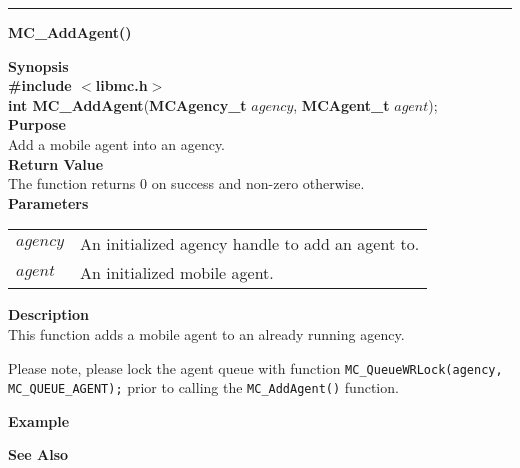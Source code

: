 \noindent
\vspace{5pt}
\rule{6.5in}{0.015in}
\noindent
{}
{\LARGE \bf MC\_AddAgent()}\\
\label{api:MC_AddAgent()}

\noindent
{\bf Synopsis}\\
{\bf \#include $<$libmc.h$>$}\\
{\bf int MC\_AddAgent}({\bf MCAgency\_t} $agency$, {\bf MCAgent\_t} $agent$);\\

\noindent
{\bf Purpose}\\
Add a mobile agent into an agency.\\

\noindent
{\bf Return Value}\\
The function returns 0 on success and non-zero otherwise.\\

\noindent
{\bf Parameters}
\vspace{-0.1in}
\begin{description}
\item
\begin{tabular}{p{10 mm}p{145 mm}} 
$agency$ & An initialized agency handle to add an agent to.\\
$agent$ & An initialized mobile agent.
\end{tabular}
\end{description}

\noindent
{\bf Description}\\
This function adds a mobile agent to an already running agency.

Please note, please lock the agent queue with function
\texttt{MC\_QueueWRLock(agency, MC\_QUEUE\_AGENT);} prior
to calling the \texttt{MC\_AddAgent()} function.

\noindent
{\bf Example}\\
\noindent
{\footnotesize}

\noindent
{\bf See Also}\\

